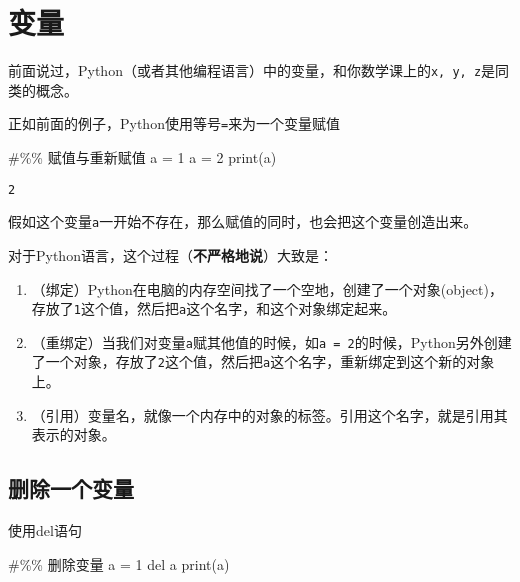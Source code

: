 \documentclass[
  letterpaper,
  DIV=11,
  numbers=noendperiod]{scrreprt}
\newenvironment{Shaded}{\begin{snugshade}}{\end{snugshade}}
\newcommand{\BuiltInTok}[1]{\textcolor[rgb]{0.00,0.23,0.31}{#1}}
\newcommand{\CommentTok}[1]{\textcolor[rgb]{0.37,0.37,0.37}{#1}}
\newcommand{\DecValTok}[1]{\textcolor[rgb]{0.68,0.00,0.00}{#1}}
\newcommand{\KeywordTok}[1]{\textcolor[rgb]{0.00,0.23,0.31}{#1}}
\newcommand{\NormalTok}[1]{\textcolor[rgb]{0.00,0.23,0.31}{#1}}
\newcommand{\OperatorTok}[1]{\textcolor[rgb]{0.37,0.37,0.37}{#1}}
\providecommand{\tightlist}{%
  \setlength{\itemsep}{0pt}\setlength{\parskip}{0pt}}\usepackage{longtable,booktabs,array}
\begin{document}
\hypertarget{ux53d8ux91cf}{%
\section{变量}\label{ux53d8ux91cf}}

前面说过，Python（或者其他编程语言）中的变量，和你数学课上的\texttt{x,\ y,\ z}是同类的概念。

正如前面的例子，Python使用等号\texttt{=}来为一个变量赋值

\begin{Shaded}
\begin{Highlighting}[]
\CommentTok{\#\%\% 赋值与重新赋值}
\NormalTok{a }\OperatorTok{=} \DecValTok{1}
\NormalTok{a }\OperatorTok{=} \DecValTok{2}
\BuiltInTok{print}\NormalTok{(a)}
\end{Highlighting}
\end{Shaded}

\begin{verbatim}
2
\end{verbatim}

假如这个变量\texttt{a}一开始不存在，那么赋值的同时，也会把这个变量创造出来。

对于Python语言，这个过程（\textbf{不严格地说}）大致是：

\begin{enumerate}
\def\labelenumi{\arabic{enumi}.}
\tightlist
\item
  （绑定）Python在电脑的内存空间找了一个空地，创建了一个对象(object)，存放了\texttt{1}这个值，然后把\texttt{a}这个名字，和这个对象绑定起来。
\item
  （重绑定）当我们对变量\texttt{a}赋其他值的时候，如\texttt{a\ =\ 2}的时候，Python另外创建了一个对象，存放了\texttt{2}这个值，然后把\texttt{a}这个名字，重新绑定到这个新的对象上。
\item
  （引用）变量名，就像一个内存中的对象的标签。引用这个名字，就是引用其表示的对象。
\end{enumerate}

\hypertarget{ux5220ux9664ux4e00ux4e2aux53d8ux91cf}{%
\subsection{删除一个变量}\label{ux5220ux9664ux4e00ux4e2aux53d8ux91cf}}

使用del语句

\begin{Shaded}
\begin{Highlighting}[]
\CommentTok{\#\%\% 删除变量}
\NormalTok{a }\OperatorTok{=} \DecValTok{1}
\KeywordTok{del}\NormalTok{ a}
\BuiltInTok{print}\NormalTok{(a)}
\end{Highlighting}
\end{Shaded}
\end{document}
